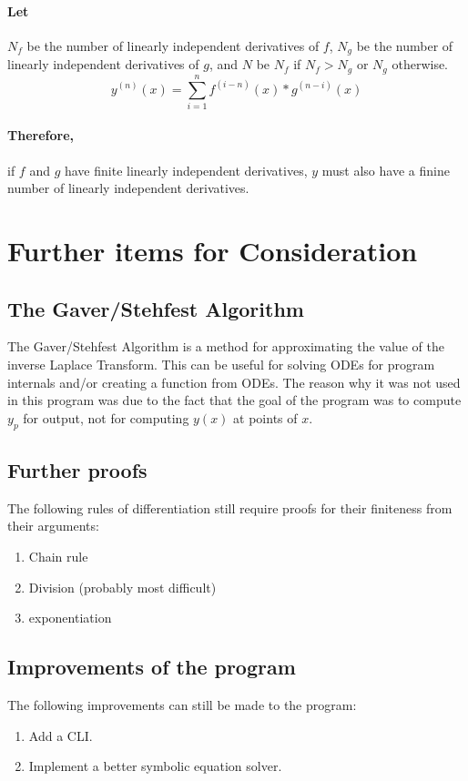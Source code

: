 \documentclass{article}
\begin{document}
\paragraph{Let} $N_f$ be the number of linearly independent derivatives of $f$, $N_g$ be the number of linearly independent derivatives of $g$, and $N$ be $N_f$ if $N_f > N_g$ or $N_g$ otherwise.
$$y^{(n)}(x)=\sum_{i=1}^n f^{(i-n)}(x) * g^{(n-i)}(x)$$
\paragraph{Therefore,} if $f$ and $g$ have finite linearly independent derivatives, $y$ must also have a finine number of linearly independent derivatives.

\pagebreak
\section{Further items for Consideration}
\subsection{The Gaver/Stehfest Algorithm}
The Gaver/Stehfest Algorithm is a method for approximating the value of the inverse Laplace Transform. 
This can be useful for solving ODEs for program internals and/or creating a function from ODEs.
The reason why it was not used in this program was due to the fact that the goal of the program was to compute $y_p$ for output, not for computing $y(x)$ at points of $x$.

\subsection{Further proofs}
The following rules of differentiation still require proofs for their finiteness from their arguments:
\begin{enumerate}
    \item Chain rule
    \item Division (probably most difficult)
    \item exponentiation
\end{enumerate}
\subsection{Improvements of the program}
The following improvements can still be made to the program:
\begin{enumerate}
    \item Add a CLI.
    \item Implement a better symbolic equation solver.
\end{enumerate}
\pagebreak\nocite{*} %


\end{document}

